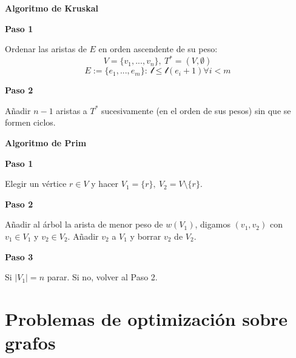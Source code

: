 \documentclass[openany]{book}
\begin{document}


\begin{theorem}
    {\textbf{\color{turquoise}Algoritmo de Kruskal}}


    \textbf{Paso 1}

    Ordenar las aristas de $ E $ en orden ascendente de su peso:
    $$ V = \{v_1,...,v_n\},\ T^* = (V, \emptyset) $$
    $$ E := \{e_1,...,e_m\}:\ \mathcal{l} \leq \mathcal{l}(e_i+1) \forall i < m $$

    \textbf{Paso 2}

    Añadir $ n-1 $ aristas a $ T^* $ sucesivamente (en el orden de sus pesos) sin que se formen ciclos.
\end{theorem}


\begin{theorem}
    {\textbf{\color{turquoise}Algoritmo de Prim}}

    \textbf{Paso 1}

    Elegir un vértice $ r \in V $ y hacer $ V_1 = \{r\},\ V_2 = V \setminus \{r\} $.

    \textbf{Paso 2}

    Añadir al árbol la arista de menor peso de $ w(V_1) $, digamos $ (v_1,v_2) $ con $ v_1 \in V_1 $ y $ v_2 \in V_2 $. Añadir $ v_2  $ a $ V_1 $ y borrar $ v_2  $ de $ V_2 $.

    \textbf{Paso 3}

    Si $ |V_1| = n $ parar. Si no, volver al Paso 2.



\end{theorem}





\section{Problemas de optimización sobre grafos}
\end{document}
